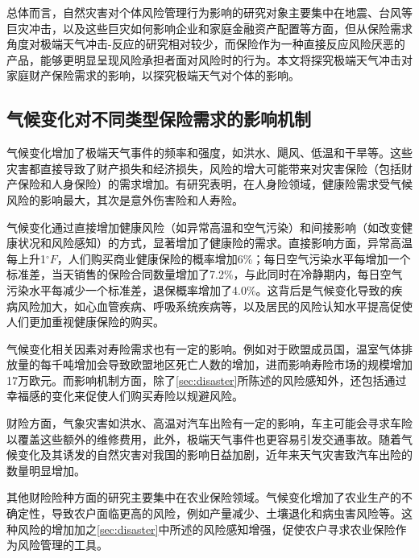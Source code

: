 总体而言，自然灾害对个体风险管理行为影响的研究对象主要集中在地震、台风等巨灾冲击，以及这些巨灾如何影响企业和家庭金融资产配置等方面，但从保险需求角度对极端天气冲击-反应的研究相对较少，而保险作为一种直接反应风险厌恶的产品，能够更明显呈现风险承担者面对风险时的行为。本文将探究极端天气冲击对家庭财产保险需求的影响，以探究极端天气对个体的影响。

\subsection{气候变化对不同类型保险需求的影响机制}

气候变化增加了极端天气事件的频率和强度，如洪水、飓风、低温和干旱等\citep{blazey2007financial}。这些灾害都直接导致了财产损失和经济损失，风险的增大可能带来对灾害保险（包括财产保险和人身保险）的需求增加。有研究表明，在人身险领域，健康险需求受气候风险的影响最大，其次是意外伤害险和人寿险\citep{JRPL202302005}。

气候变化通过直接增加健康风险（如异常高温和空气污染）和间接影响（如改变健康状况和风险感知）的方式，显著增加了健康险的需求。直接影响方面，异常高温每上升1$^\circ F$，人们购买商业健康保险的概率增加6\%\citep{zhong2022exposure}；每日空气污染水平每增加一个标准差，当天销售的保险合同数量增加了7.2\%，与此同时在冷静期内，每日空气污染水平每减少一个标准差，退保概率增加了4.0\%\citep{2018Something}。这背后是气候变化导致的疾病风险加大，如心血管疾病、呼吸系统疾病等\citep{aitken2022climate,brown2008climate}，以及居民的风险认知水平提高\citep{1021776338.nh}促使人们更加重视健康保险的购买。

气候变化相关因素对寿险需求也有一定的影响。例如对于欧盟成员国，温室气体排放量的每千吨增加会导致欧盟地区死亡人数的增加，进而影响寿险市场的规模增加17万欧元\citep{melnychenko2021influence}。而影响机制方面，除了\ref{sec:disaster}所陈述的风险感知外，还包括通过幸福感的变化来促使人们购买寿险以规避风险\citep{avdeenko2021impact}。

财险方面，气象灾害如洪水、高温对汽车出险有一定的影响，车主可能会寻求车险以覆盖这些额外的维修费用\citep{changnon1997effects,xu2014climate}，此外，极端天气事件也更容易引发交通事故\citep{吴建平2008交通事故与天气气候关系分析}。随着气候变化及其诱发的自然灾害对我国的影响日益加剧，近年来天气灾害致汽车出险的数量明显增加\citep{张翠华2020天气灾害致车险理赔的风险分析}。

其他财险险种方面的研究主要集中在农业保险领域。气候变化增加了农业生产的不确定性，导致农户面临更高的风险，例如产量减少、土壤退化和病虫害风险等。这种风险的增加加之\ref{sec:disaster}中所述的风险感知增强，促使农户寻求农业保险作为风险管理的工具\citep{falco2014crop,胡新艳2021气候变化,TJLT202108007}。

